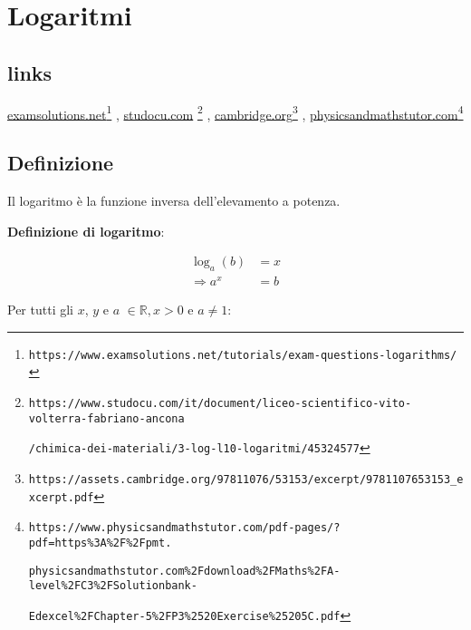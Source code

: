 \section{Logaritmi}

\subsection{links}

\href{https://www.examsolutions.net/tutorials/exam-questions-logarithms/}{examsolutions.net}\footnote{\texttt{https://www.examsolutions.net/tutorials/exam-questions-logarithms/}}
, \href{https://www.studocu.com/it/document/liceo-scientifico-vito-volterra-fabriano-ancona/chimica-dei-materiali/3-log-l10-logaritmi/45324577}{studocu.com} \footnote{\texttt{https://www.studocu.com/it/document/liceo-scientifico-vito-volterra-fabriano-ancona} 

\texttt{/chimica-dei-materiali/3-log-l10-logaritmi/45324577}}
, \href{https://assets.cambridge.org/97811076/53153/excerpt/9781107653153\_excerpt.pdf}{cambridge.org}\footnote{\texttt{https://assets.cambridge.org/97811076/53153/excerpt/9781107653153\_excerpt.pdf}}
, \href{https://www.physicsandmathstutor.com/pdf-pages/?pdf=https\%3A\%2F\%2Fpmt.physicsandmathstutor.com\%2Fdownload\%2FMaths\%2FA-level\%2FC3\%2FSolutionbank-Edexcel\%2FChapter-5\%2FP3\%2520Exercise\%25205C.pdf}{physicsandmathstutor.com}\footnote{\texttt{https://www.physicsandmathstutor.com/pdf-pages/?pdf=https\%3A\%2F\%2Fpmt.}

\texttt{physicsandmathstutor.com\%2Fdownload\%2FMaths\%2FA-level\%2FC3\%2FSolutionbank-}

\texttt{Edexcel\%2FChapter-5\%2FP3\%2520Exercise\%25205C.pdf}}


\subsection{Definizione}

Il logaritmo è la funzione inversa dell'elevamento a potenza.

\textbf{Definizione di logaritmo}:

\begin{equation*}
\begin{split}
\log_a(b)&=x \\
\Rightarrow
a^x&=b
\end{split}
\end{equation*}

Per tutti gli $x$, $y$ e $a$ $ \in \mathbb{R}, x>0$ e $a \neq 1$:

